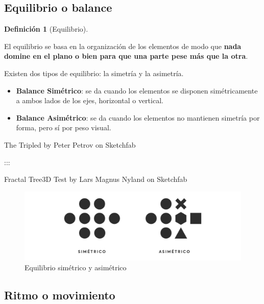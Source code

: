 \documentclass[
  16pt,
]{krantz}
\theoremstyle{definition}
\newtheorem{definition}{Definición}[chapter]
\theoremstyle{definition}
\theoremstyle{definition}
\theoremstyle{definition}
\theoremstyle{remark}
\begin{document}
\hypertarget{equilibrio-o-balance}{%
\subsection{Equilibrio o balance}\label{equilibrio-o-balance}}

\begin{definition}[Equilibrio]
\protect\hypertarget{def:r}{}\label{def:r}

El equilibrio se basa en la organización de los elementos de modo que \textbf{nada domine en el plano o bien para que una parte pese más que la otra}.

Existen dos tipos de equilibrio: la simetría y la asimetría.

\begin{itemize}
\item
  \textbf{Balance Simétrico}: se da cuando los elementos se disponen simétricamente a ambos lados de los ejes, horizontal o vertical.
\item
  \textbf{Balance Asimétrico}: se da cuando los elementos no mantienen simetría por forma, pero sí por peso visual.
\end{itemize}

\end{definition}

The Tripled by Peter Petrov on Sketchfab

:::

Fractal Tree3D Test by Lars Magnus Nyland on Sketchfab

\begin{figure}

{\centering \includegraphics[width=1\linewidth,height=1\textheight]{equilibrio} 

}

\caption{Equilibrio simétrico y asimétrico}\label{fig:equilibrio}
\end{figure}

\hypertarget{ritmo-o-movimiento}{%
\subsection{Ritmo o movimiento}\label{ritmo-o-movimiento}}
\end{document}

